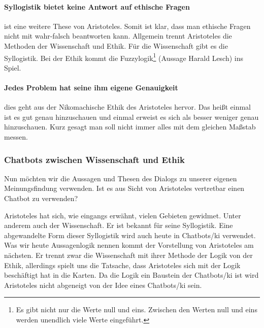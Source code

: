 \paragraph{Syllogistik bietet keine Antwort auf ethische Fragen} ist eine weitere These von Aristoteles. Somit ist klar, dass man ethische Fragen nicht mit wahr-falsch beantworten kann. Allgemein trennt Aristoteles die Methoden der Wissenschaft und Ethik. Für die Wissenschaft gibt es die Syllogistik. Bei der Ethik kommt die Fuzzylogik\footnote{Es gibt nicht nur die Werte null und eins. Zwischen  den Werten null und eins werden unendlich viele Werte eingeführt.} (Aussage Harald Lesch) ins Spiel.

\paragraph{Jedes Problem hat seine ihm eigene Genauigkeit} dies geht aus der Nikomachische Ethik des Aristoteles hervor. Das heißt einmal ist es gut genau hinzuschauen und einmal erweist es sich als besser weniger genau hinzuschauen. Kurz gesagt man soll nicht immer alles mit dem gleichen Maßstab messen.

\subsubsection{Chatbots zwischen Wissenschaft und Ethik}

Nun möchten wir die Aussagen und Thesen des Dialogs zu unserer eigenen Meinungsfindung verwenden. Ist es aus Sicht von Aristoteles vertretbar einen Chatbot zu verwenden? 

Aristoteles hat sich, wie eingangs erwähnt, vielen Gebieten gewidmet. Unter anderem auch der Wissenschaft. Er ist bekannt für seine Syllogistik. Eine abgewandelte Form dieser Syllogistik wird auch heute in Chatbots/\ac{ki} verwendet. Was wir heute Aussagenlogik nennen kommt der Vorstellung von Aristoteles am nächsten. Er trennt zwar die Wissenschaft mit ihrer Methode der Logik von der Ethik, allerdings spielt uns die Tatsache, dass Aristoteles sich mit der Logik beschäftigt hat in die Karten. Da die Logik ein Baustein der Chatbots/\ac{ki} ist wird Aristoteles nicht abgeneigt von der Idee eines Chatbots/\ac{ki} sein. 

